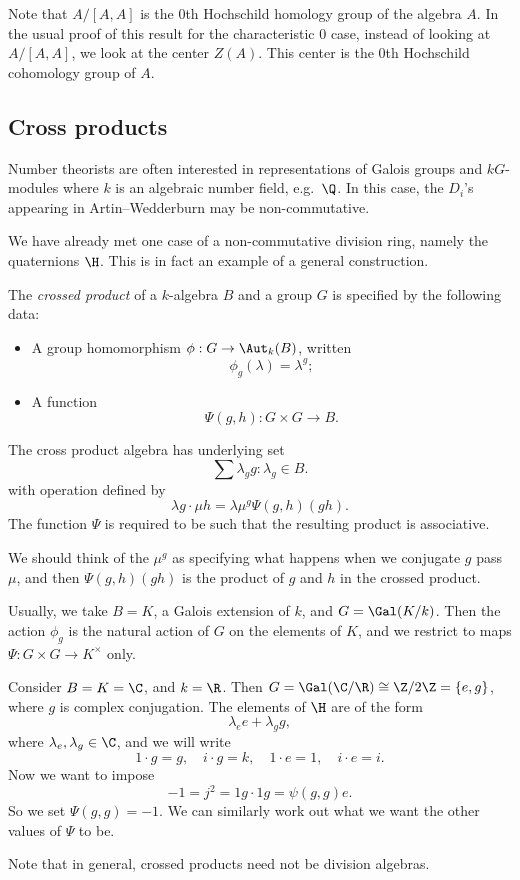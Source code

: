 \documentclass[a4paper]{article}
\begin{document}
Note that $A/[A, A]$ is the $0$th Hochschild homology group of the algebra $A$. In the usual proof of this result for the characteristic $0$ case, instead of looking at $A/[A, A]$, we look at the center $Z(A)$. This center is the $0$th Hochschild cohomology group of $A$.

\subsection{Cross products}
Number theorists are often interested in representations of Galois groups and $kG$-modules where $k$ is an algebraic number field, e.g.\ $\Q$. In this case, the $D_i$'s appearing in Artin--Wedderburn may be non-commutative.

We have already met one case of a non-commutative division ring, namely the quaternions $\H$. This is in fact an example of a general construction.

\begin{defi}
  The \emph{crossed product} of a $k$-algebra $B$ and a group $G$ is specified by the following data:
  \begin{itemize}
    \item A group homomorphism $\phi: G \to \Aut_k(B)$, written
      \[
        \phi_g(\lambda) = \lambda^g;
      \]
    \item A function
      \[
        \Psi(g, h): G \times G \to B.
      \]
  \end{itemize}
  The cross product algebra has underlying set
  \[
    \sum \lambda_g g: \lambda_g \in B.
  \]
  with operation defined by
  \[
    \lambda g \cdot \mu h = \lambda \mu^g \Psi(g, h) (gh).
  \]
  The function $\Psi$ is required to be such that the resulting product is associative.
\end{defi}
We should think of the $\mu^g$ as specifying what happens when we conjugate $g$ pass $\mu$, and then $\Psi(g, h) (gh)$ is the product of $g$ and $h$ in the crossed product.

Usually, we take $B = K$, a Galois extension of $k$, and $G = \Gal(K/k)$. Then the action $\phi_g$ is the natural action of $G$ on the elements of $K$, and we restrict to maps $\Psi: G \times G \to K^\times$ only.

\begin{eg}
  Consider $B = K = \C$, and $k = \R$. Then $G = \Gal(\C/\R) \cong \Z/2\Z = \{e, g\}$, where $g$ is complex conjugation. The elements of $\H$ are of the form
  \[
    \lambda_e e + \lambda_g g,
  \]
  where $\lambda_e, \lambda_g \in \C$, and we will write
  \[
    1 \cdot g = g,\quad i \cdot g = k,\quad 1 \cdot e = 1,\quad i \cdot e = i.
  \]
  Now we want to impose
  \[
    -1 = j^2 = 1g \cdot 1g = \psi(g, g) e.
  \]
  So we set $\Psi(g, g) = -1$. We can similarly work out what we want the other values of $\Psi$ to be. %
\end{eg}
Note that in general, crossed products need not be division algebras.
\end{document}
